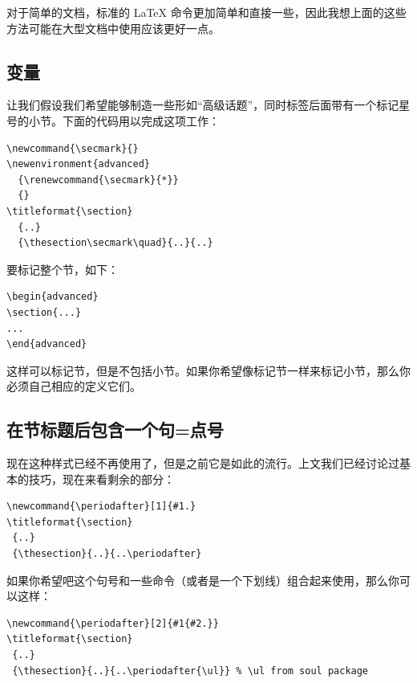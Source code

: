 \documentclass[a4paper,nofonts]{ltxguide}
\begin{document}
对于简单的文档，标准的 \LaTeX{} 命令更加简单和直接一些，因此我想上面的这些方法可能在大型文档中使用应该更好一点。

\subsection{变量}

让我们假设我们希望能够制造一些形如``高级话题''，同时标签后面带有一个标记星号的小节。下面的代码用以完成这项工作：
\begin{verbatim}
\newcommand{\secmark}{}
\newenvironment{advanced}
  {\renewcommand{\secmark}{*}}
  {}
\titleformat{\section}
  {..}
  {\thesection\secmark\quad}{..}{..}
\end{verbatim}

要标记整个节，如下：
\begin{verbatim}
\begin{advanced}
\section{...}
...
\end{advanced}
\end{verbatim}

这样可以标记节，但是不包括小节。如果你希望像标记节一样来标记小节，那么你必须自己相应的定义它们。

\subsection{在节标题后包含一个句=点号}
\label{sec:dotafter}

现在这种样式已经不再使用了，但是之前它是如此的流行。上文我们已经讨论过基本的技巧，现在来看剩余的部分：
\begin{verbatim}
\newcommand{\periodafter}[1]{#1.}
\titleformat{\section}
 {..}
 {\thesection}{..}{..\periodafter}
\end{verbatim}

如果你希望吧这个句号和一些命令（或者是一个下划线）组合起来使用，那么你可以这样：
\begin{verbatim}
\newcommand{\periodafter}[2]{#1{#2.}}
\titleformat{\section}
 {..}
 {\thesection}{..}{..\periodafter{\ul}} % \ul from soul package
\end{verbatim}
\end{document}
